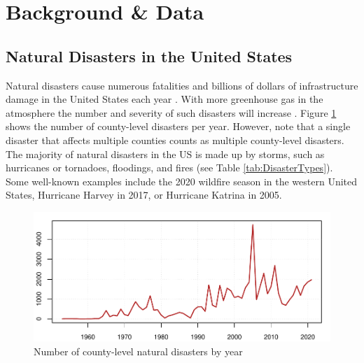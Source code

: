 
\section{Background \& Data} \label{Data}

\subsection{Natural Disasters in the United States}

Natural disasters cause numerous fatalities and billions of dollars of infrastructure damage in the United States each year \citep{Boustan_2020}. With more greenhouse gas in the atmosphere the number and severity of such disasters will increase \citep{IPCC_2021}. Figure \ref{DisasterCount} shows the number of county-level disasters per year. However, note that a single disaster that affects multiple counties counts as multiple county-level disasters. The majority of natural disasters in the US is made up by storms, such as hurricanes or tornadoes, floodings, and fires (see Table \ref{tab:DisasterTypes}). Some well-known examples include the 2020 wildfire season in the western United States, Hurricane Harvey in 2017, or Hurricane Katrina in 2005.

\begin{figure}[!h]
	\centering
	\includegraphics[scale=1]{"../Code & Data/DisasterCount.pdf"}
	\caption{Number of county-level natural disasters by year}
	\label{DisasterCount}
\end{figure}

